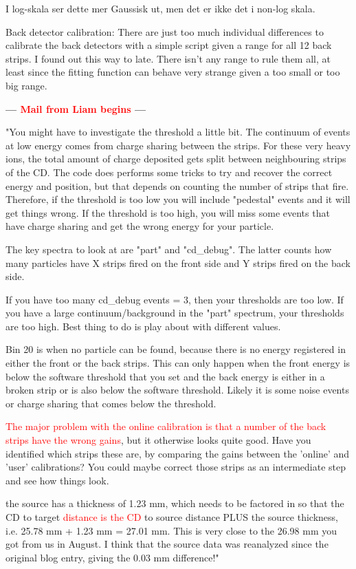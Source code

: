\documentclass[twoside,english]{uiofysmaster/uiofysmaster}
\begin{document}
I log-skala ser dette mer Gaussisk ut, men det er ikke det i non-log skala. 


Back detector calibration: There are just too much individual differences to calibrate the back detectors with a simple script given a range for all 12 back strips. I found out this way to late. There isn't any range to rule them all, at least since the fitting function can behave very strange given a too small or too big range.



\textbf{--- \textcolor{red}{Mail from Liam begins} ---}

"You might have to investigate the threshold a little bit. The continuum of events at low energy comes from charge sharing between the strips. For these very heavy ions, the total amount of charge deposited gets split between neighbouring strips of the CD. The code does performs some tricks to try and recover the correct energy and position, but that depends on counting the number of strips that fire. Therefore, if the threshold is too low you will include "pedestal" events and it will get things wrong. If the threshold is too high, you will miss some events that have charge sharing and get the wrong energy for your particle. 

The key spectra to look at are "part" and "cd\_debug". The latter counts how many particles have X strips fired on the front side and Y strips fired on the back side.

If you have too many cd\_debug events = 3, then your thresholds are too low. If you have a large continuum/background in the "part" spectrum, your thresholds are too high. Best thing to do is play about with different values.

Bin 20 is when no particle can be found, because there is no energy registered in either the front or the back strips. This can only happen when the front energy is below the software threshold that you set and the back energy is either in a broken strip or is also below the software threshold. Likely it is some noise events or charge sharing that comes below the threshold.

\textcolor{red}{The major problem with the online calibration is that a number of the back strips have the wrong gains}, but it otherwise looks quite good. Have you identified which strips these are, by comparing the gains between the 'online' and 'user' calibrations? You could maybe correct those strips as an intermediate step and see how things look.

the source has a thickness of 1.23 mm, which needs to be factored in so that the CD to target \textcolor{red}{distance is the CD} to source distance PLUS the source thickness, i.e. 25.78 mm + 1.23 mm =  27.01 mm. This is very close to the 26.98 mm you got from us in August. I think that the source data was reanalyzed since the original blog entry, giving the 0.03 mm difference!"
\end{document}
